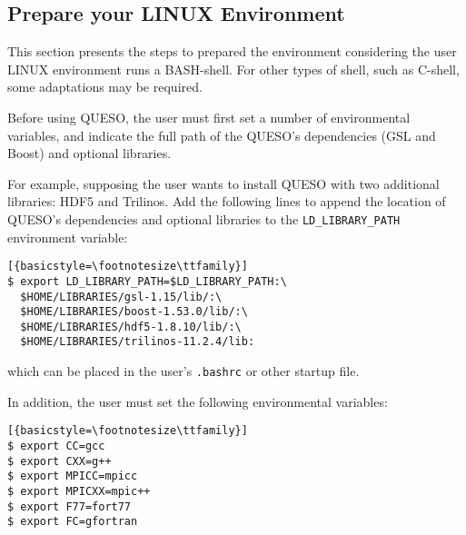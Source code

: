 


\subsection{Prepare your LINUX Environment}\label{sec:prepare}


This section presents the steps to prepared the environment
considering the user LINUX environment runs a BASH-shell. For other types of shell, such as C-shell, some adaptations may be required.

Before using QUESO, the user must first set a number of environmental variables, and indicate the full path
of the QUESO's dependencies (GSL and Boost) and optional libraries.

For example, supposing the user wants to install QUESO with two additional libraries: HDF5 and Trilinos.
Add the following lines to append the location of QUESO's dependencies and optional libraries to the \verb+LD_LIBRARY_PATH+ environment variable:
%
\begin{lstlisting}[{basicstyle=\footnotesize\ttfamily}]
$ export LD_LIBRARY_PATH=$LD_LIBRARY_PATH:\
  $HOME/LIBRARIES/gsl-1.15/lib/:\
  $HOME/LIBRARIES/boost-1.53.0/lib/:\
  $HOME/LIBRARIES/hdf5-1.8.10/lib/:\
  $HOME/LIBRARIES/trilinos-11.2.4/lib:
\end{lstlisting}
which can be placed in the user's \verb+.bashrc+ or other startup file.

In addition, the user must set the following environmental
variables:
\begin{lstlisting}[{basicstyle=\footnotesize\ttfamily}]
$ export CC=gcc
$ export CXX=g++
$ export MPICC=mpicc
$ export MPICXX=mpic++
$ export F77=fort77
$ export FC=gfortran
\end{lstlisting}



